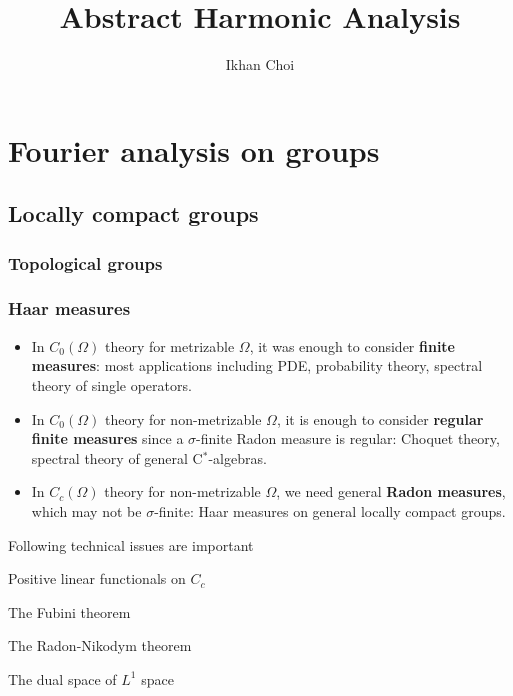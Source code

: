 \documentclass{../../large}
\begin{document}
\title{Abstract Harmonic Analysis}
\author{Ikhan Choi}
\maketitle
\tableofcontents



\part{Fourier analysis on groups}
\chapter{Locally compact groups}
\section{Topological groups}
\section{Haar measures}

\begin{itemize}
\item In $C_0(\Omega)$ theory for metrizable $\Omega$, it was enough to consider \textbf{finite measures}: most applications including PDE, probability theory, spectral theory of single operators.
\item In $C_0(\Omega)$ theory for non-metrizable $\Omega$, it is enough to consider \textbf{regular finite measures} since a $\sigma$-finite Radon measure is regular: Choquet theory, spectral theory of general C$^*$-algebras.
\item In $C_c(\Omega)$ theory for non-metrizable $\Omega$, we need general \textbf{Radon measures}, which may not be $\sigma$-finite: Haar measures on general locally compact groups.
\end{itemize}



\begin{prb}
Following technical issues are important
\begin{parts}
\item Positive linear functionals on $C_c$
\item The Fubini theorem
\item The Radon-Nikodym theorem
\item The dual space of $L^1$ space
\end{parts}
\end{prb}
\end{document}
